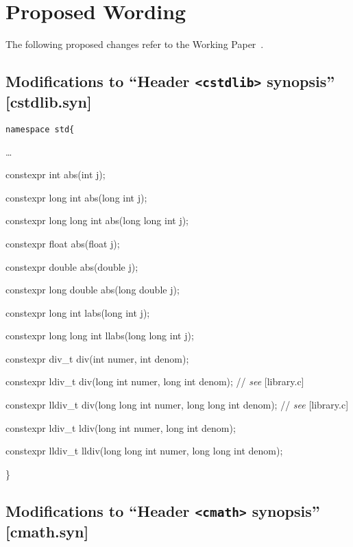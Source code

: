 \documentclass[prd,twocolumn,amsmath,amssymb,nofootinbib,eqsecnum]{revtex4-1}
\newcommand{\code}[1]{{\tt #1}}
\newcommand{\header}[1]{{\tt <#1>}}
\newcommand{\highlight}[1]{{\color{red} #1}}
\newcommand{\stdcomment}[1]{{// {\em see} [#1]}}
\begin{document}
\section{Proposed Wording}

The following proposed changes refer to the Working Paper~\cite{WorkingPaper}.

\subsection{Modifications to ``Header \header{cstdlib} synopsis'' [cstdlib.syn]}


\code{namespace std\{

\vspace{2ex}

\ldots

\vspace{2ex}

\highlight{constexpr} int abs(int j);

\highlight{constexpr}  long int abs(long int j);

\highlight{constexpr}  long long int abs(long long int j);

\highlight{constexpr}  float abs(float j);

\highlight{constexpr} double abs(double j);

\highlight{constexpr} long double abs(long double j);

\vspace{2ex}

\highlight{constexpr} long int labs(long int j);

\highlight{constexpr}  long long int llabs(long long int j);

\vspace{2ex}

\highlight{constexpr} div\_t div(int numer, int denom);

\highlight{constexpr} ldiv\_t div(long int numer, long int denom); \stdcomment{library.c}

\highlight{constexpr} lldiv\_t div(long long int numer, long long int denom); \stdcomment{library.c}

\highlight{constexpr} ldiv\_t ldiv(long int numer, long int denom);

\highlight{constexpr} lldiv\_t lldiv(long long int numer, long long int denom);	

\}}

\subsection{Modifications to  ``Header \header{cmath} synopsis'' [cmath.syn]}
\end{document}
